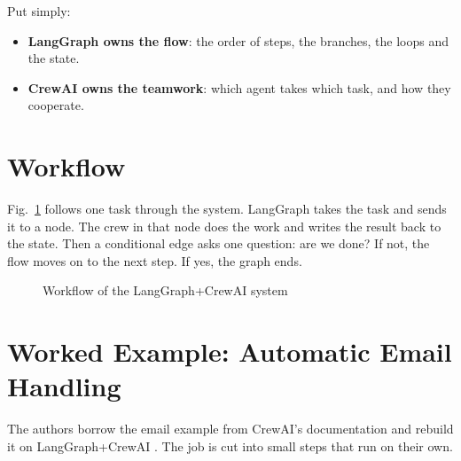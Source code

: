 \documentclass[12pt,a4paper]{report}
\begin{document}
Put simply:
\begin{itemize}
    \item \textbf{LangGraph owns the flow}: the order of steps, the branches, the loops and the state.
    \item \textbf{CrewAI owns the teamwork}: which agent takes which task, and how they cooperate.
\end{itemize}

\section{Workflow}

Fig.~\ref{fig:workflow} follows one task through the system. LangGraph takes the task and sends it to a node. The crew in that node does the work and writes the result back to the state. Then a conditional edge asks one question: are we done? If not, the flow moves on to the next step. If yes, the graph ends.

\begin{figure}[H]
\centering
{}
\caption{Workflow of the LangGraph+CrewAI system}
\label{fig:workflow}
\end{figure}

\section{Worked Example: Automatic Email Handling}

The authors borrow the email example from CrewAI's documentation and rebuild it on LangGraph+CrewAI \cite{duan2024langgraphcrewai}. The job is cut into small steps that run on their own.
\end{document}
